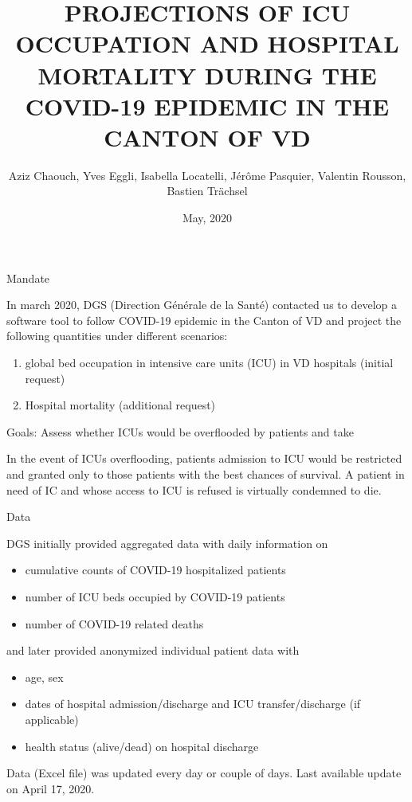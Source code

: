 \documentclass[t,9pt,xcolor=dvipsnames]{beamer}              %
\title{PROJECTIONS OF ICU OCCUPATION AND HOSPITAL MORTALITY DURING THE COVID-19 EPIDEMIC IN THE CANTON OF VD}
\subtitle{}
\author{Aziz Chaouch, Yves Eggli, Isabella Locatelli, Jérôme Pasquier, Valentin Rousson, Bastien Trächsel}
\institute{Center for Primary Care and Public Health (Unisanté), University of Lausanne, Switzerland}
\date{May, 2020}
\begin{document}
\begin{frame}
\titlepage

\note{
\tiny

}
\end{frame}

\begin{frame}{Mandate}
\justifying

In march 2020, DGS (Direction Générale de la Santé) contacted us to develop a software tool to follow COVID-19 epidemic in the Canton of VD and project the following quantities under different scenarios:
\begin{enumerate}
\item global bed occupation in intensive care units (ICU) in VD hospitals (initial request)
\item Hospital mortality (additional request)
\end{enumerate}

\alert{Goals}: Assess whether ICUs would be  overflooded by patients and take

In the event of ICUs overflooding, patients admission to ICU would be restricted and granted only to those patients with the best chances of survival. A patient in need of IC and whose access to ICU is refused is virtually condemned to die.

\note{
\tiny
\justifying

}
\end{frame}

\begin{frame}{Data}
\justifying

DGS initially provided \alert{aggregated data} with daily information on
\begin{itemize}
\item cumulative counts of COVID-19 hospitalized patients
\item number of ICU beds occupied by COVID-19 patients
\item number of COVID-19 related deaths
\end{itemize}
\bigskip

and later provided anonymized \alert{individual patient data} with
\begin{itemize}
\item age, sex
\item dates of hospital admission/discharge and ICU transfer/discharge (if applicable)
\item health status (alive/dead) on hospital discharge
\end{itemize}

Data (Excel file) was updated every day or couple of days. Last available update on April 17, 2020.

\note{
\tiny
\justifying

}
\end{frame}
\end{document}
